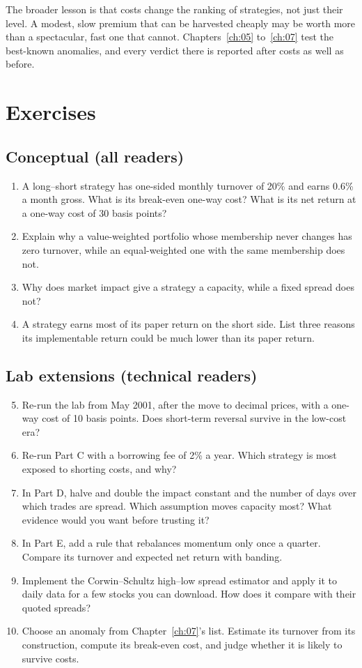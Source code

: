 The broader lesson is that costs change the ranking of strategies, not just their level. A modest, slow premium that can be harvested cheaply may be worth more than a spectacular, fast one that cannot. Chapters~\ref{ch:05} to~\ref{ch:07} test the best-known anomalies, and every verdict there is reported after costs as well as before.

\section*{Exercises}

\subsection*{Conceptual (all readers)}

\begin{enumerate}
  \item A long--short strategy has one-sided monthly turnover of 20\% and earns 0.6\% a month gross. What is its break-even one-way cost? What is its net return at a one-way cost of 30 basis points?
  \item Explain why a value-weighted portfolio whose membership never changes has zero turnover, while an equal-weighted one with the same membership does not.
  \item Why does market impact give a strategy a capacity, while a fixed spread does not?
  \item A strategy earns most of its paper return on the short side. List three reasons its implementable return could be much lower than its paper return.
\end{enumerate}

\subsection*{Lab extensions (technical readers)}

\begin{enumerate}
  \setcounter{enumi}{4}
  \item Re-run the lab from May 2001, after the move to decimal prices, with a one-way cost of 10 basis points. Does short-term reversal survive in the low-cost era?
  \item Re-run Part C with a borrowing fee of 2\% a year. Which strategy is most exposed to shorting costs, and why?
  \item In Part D, halve and double the impact constant and the number of days over which trades are spread. Which assumption moves capacity most? What evidence would you want before trusting it?
  \item In Part E, add a rule that rebalances momentum only once a quarter. Compare its turnover and expected net return with banding.
  \item Implement the Corwin--Schultz high--low spread estimator and apply it to daily data for a few stocks you can download. How does it compare with their quoted spreads?
  \item Choose an anomaly from Chapter~\ref{ch:07}'s list. Estimate its turnover from its construction, compute its break-even cost, and judge whether it is likely to survive costs.
\end{enumerate}
